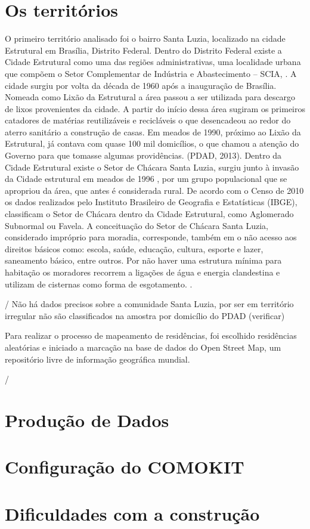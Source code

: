 \section{Os territórios}

O primeiro território analisado foi o bairro Santa Luzia, localizado na cidade Estrutural em Brasília, Distrito Federal.  Dentro do Distrito Federal existe a Cidade Estrutural como uma das regiões administrativas, uma localidade urbana que compõem o Setor Complementar de Indústria e
Abastecimento – SCIA, \cite{souza2016nao}.
A cidade surgiu por volta da década de 1960 após a inauguração de Brasília. Nomeada como Lixão da Estrutural a área passou a ser utilizada para descargo de lixos provenientes da cidade. A partir do início dessa área sugiram os primeiros catadores de matérias reutilizáveis e recicláveis o que desencadeou ao redor do aterro sanitário a construção de casas. Em meados de 1990, próximo ao Lixão da Estrutural, já contava com quase 100 mil domicílios, o que chamou a atenção do Governo para que tomasse algumas providências. (PDAD, 2013).
Dentro da Cidade Estrutural existe o Setor de Chácara Santa Luzia, surgiu junto à invasão da Cidade estrutural em meados de 1996 , por um grupo populacional que se apropriou da área, que antes é considerada rural. De acordo com o Censo de 2010 os dados realizados pelo Instituto Brasileiro de Geografia e Estatísticas (IBGE), classificam o Setor de Chácara dentro da Cidade Estrutural, como Aglomerado Subnormal ou Favela. \cite{souza2016nao}
A conceituação do Setor de Chácara Santa Luzia, considerado impróprio para moradia, corresponde, também em o não acesso aos direitos básicos como: escola, saúde, educação, cultura, esporte e lazer, saneamento básico, entre outros. Por não haver uma estrutura mínima para habitação os moradores recorrem a ligações de água e energia clandestina e utilizam de cisternas como forma de esgotamento. \cite{souza2016nao}.

/%
Não há dados precisos sobre a comunidade Santa Luzia, por ser em território irregular não são classificados na amostra por domicílio do PDAD (verificar)



Para realizar o processo de mapeamento de residências, foi escolhido residências aleatórias e iniciado a marcação na base de dados do Open Street Map, um repositório livre de informação geográfica mundial.


/%

\section{Produção de Dados}
\section{Configuração do COMOKIT}
\section{Dificuldades com a construção}

